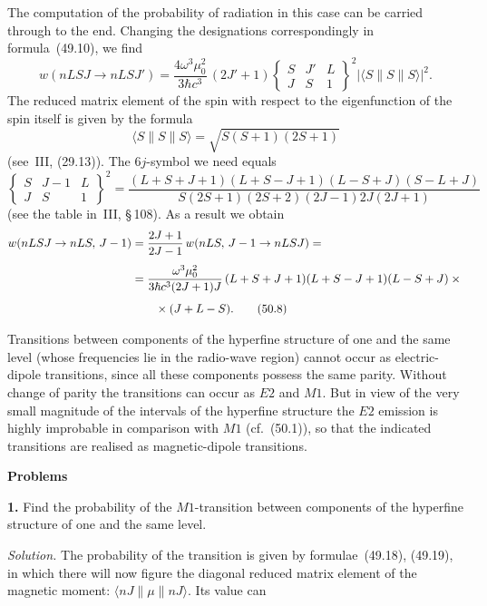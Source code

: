 The computation of the probability of radiation in this case can be carried through to the end. Changing the designations correspondingly in formula~(49.10), we find
\[
w(nLSJ \to nLSJ') = \frac{4\omega^3\mu^2_0}{3\hbar c^3}\,(2J'+1)\begin{Bmatrix} S & J' & L \\ J & S & 1\end{Bmatrix}^{\!2}|\langle S\|S\|S\rangle|^2.
\]
The reduced matrix element of the spin with respect to the eigenfunction of the spin itself is given by the formula
\begin{equation}
\langle S\|S\|S\rangle = \sqrt{S(S+1)(2S+1)}
\tag{50.6}
\end{equation}
(see~III, (29.13)). The $6j$-symbol we need equals
\begin{equation}
\begin{Bmatrix} S & J-1 & L \\ J & S & 1\end{Bmatrix}^{\!2} = \frac{(L+S+J+1)(L+S-J+1)(L-S+J)(S-L+J)}{S(2S+1)(2S+2)(2J-1)2J(2J+1)}
\tag{50.7}
\end{equation}
(see the table in~III, \S\,108). As a result we obtain
\begin{align}
w(nLSJ \to nLS,\,J-1) &= \frac{2J+1}{2J-1}\,w(nLS,\,J-1 \to nLSJ) ={}\notag\\[4pt]
&= \frac{\omega^3\mu^2_0}{3\hbar c^3(2J+1)J}\,(L+S+J+1)(L+S-J+1)(L-S+J)\times{}\notag\\[4pt]
&\qquad{}\times (J+L-S).
\tag{50.8}
\end{align}

Transitions between components of the hyperfine structure of one and the same level (whose frequencies lie in the radio-wave region) cannot occur as electric-dipole transitions, since all these components possess the same parity. Without change of parity the transitions can occur as $E2$ and $M1$. But in view of the very small magnitude of the intervals of the hyperfine structure the $E2$ emission is highly improbable in comparison with $M1$ (cf.~(50.1)), so that the indicated transitions are realised as magnetic-dipole transitions.

\bigskip
\begin{center}\textbf{Problems}\end{center}
\smallskip
\textbf{1.} Find the probability of the $M1$-transition between components of the hyperfine structure of one and the same level.

\textit{Solution.} The probability of the transition is given by formulae~(49.18), (49.19), in which there will now figure the diagonal reduced matrix element of the magnetic moment: $\langle nJ\|\mu\|nJ\rangle$. Its value can

